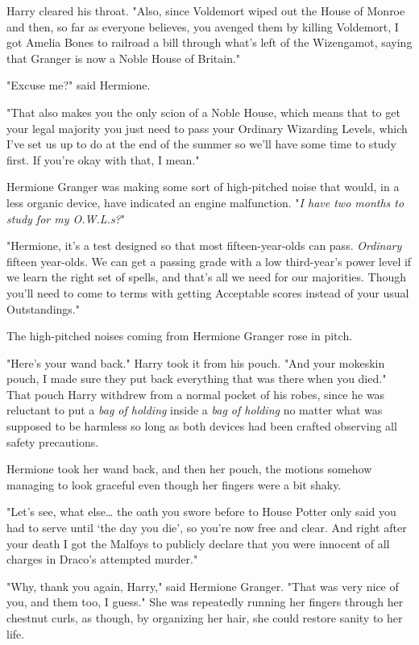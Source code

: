 Harry cleared his throat. "Also, since Voldemort wiped out the House of Monroe
and then, so far as everyone believes, you avenged them by killing Voldemort, I
got Amelia Bones to railroad a bill through what's left of the Wizengamot,
saying that Granger is now a Noble House of Britain."

"Excuse me?" said Hermione.

"That also makes you the only scion of a Noble House, which means that to get
your legal majority you just need to pass your Ordinary Wizarding Levels, which
I've set us up to do at the end of the summer so we'll have some time to study
first. If you're okay with that, I mean."

Hermione Granger was making some sort of high-pitched noise that would, in a
less organic device, have indicated an engine malfunction. "\emph{I have two
months to study for my O.W.L.s?}"

"Hermione, it's a test designed so that most fifteen-year-olds can pass.
\emph{Ordinary} fifteen year-olds. We can get a passing grade with a low
third-year's power level if we learn the right set of spells, and that's all we
need for our majorities. Though you'll need to come to terms with getting
Acceptable scores instead of your usual Outstandings."

The high-pitched noises coming from Hermione Granger rose in pitch.

"Here's your wand back." Harry took it from his pouch. "And your mokeskin
pouch, I made sure they put back everything that was there when you died." That
pouch Harry withdrew from a normal pocket of his robes, since he was reluctant
to put a \emph{bag of holding} inside a \emph{bag of holding} no matter what
was supposed to be harmless so long as both devices had been crafted observing
all safety precautions.

Hermione took her wand back, and then her pouch, the motions somehow managing
to look graceful even though her fingers were a bit shaky.

"Let's see, what else{\ldots} the oath you swore before to House Potter only
said you had to serve until `the day you die', so you're now free and clear.
And right after your death I got the Malfoys to publicly declare that you were
innocent of all charges in Draco's attempted murder."

"Why, thank you again, Harry," said Hermione Granger. "That was very nice of
you, and them too, I guess." She was repeatedly running her fingers through her
chestnut curls, as though, by organizing her hair, she could restore sanity to
her life.


